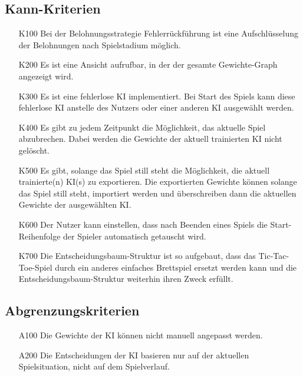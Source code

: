 \documentclass[titlepage]{scrartcl}
\begin{document}
\subsection{Kann-Kriterien}
	\begin{itemize}
		\item[K100] Bei der Belohnungsstrategie Fehlerrückführung ist eine Aufschlüsselung der Belohnungen nach Spielstadium möglich.
		\item[K200] Es ist eine Ansicht aufrufbar, in der der gesamte Gewichte-Graph angezeigt wird.
		\item[K300] Es ist eine fehlerlose KI implementiert. Bei Start des Spiels kann diese fehlerlose KI anstelle des Nutzers oder einer anderen KI ausgewählt werden.
		\item[K400] Es gibt zu jedem Zeitpunkt die Möglichkeit, das aktuelle Spiel abzubrechen. Dabei werden die Gewichte der aktuell trainierten KI nicht gelöscht.
		\item[K500] Es gibt, solange das Spiel still steht die Möglichkeit, die aktuell trainierte(n) KI(s) zu exportieren. Die exportierten Gewichte können solange das Spiel still steht, importiert werden und überschreiben dann die aktuellen Gewichte der ausgewählten KI.
		\item[K600] Der Nutzer kann einstellen, dass nach Beenden eines Spiels die Start-Reihenfolge der Spieler automatisch getauscht wird.
		\item[K700] Die Entscheidungsbaum-Struktur ist so aufgebaut, dass das Tic-Tac-Toe-Spiel durch ein anderes einfaches Brettspiel ersetzt werden kann und die Entscheidungsbaum-Struktur weiterhin ihren Zweck erfüllt.

	\end{itemize}

	
\subsection{Abgrenzungskriterien}
	\begin{itemize}
		\item[A100] Die Gewichte der KI können nicht manuell angepasst werden.
		\item[A200] Die Entscheidungen der KI basieren nur auf der aktuellen Spielsituation, nicht auf dem Spielverlauf.
	\end{itemize}
	
\end{document}
